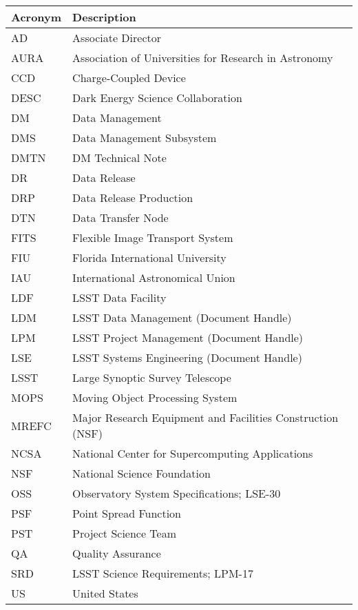 \addtocounter{table}{-1}
\begin{longtable}{|l|p{}|}\hline
\textbf{Acronym} & \textbf{Description}  \\\hline

AD & Associate Director \\\hline
AURA & Association of Universities for Research in Astronomy \\\hline
CCD & Charge-Coupled Device \\\hline
DESC & Dark Energy Science Collaboration \\\hline
DM & Data Management \\\hline
DMS & Data Management Subsystem \\\hline
DMTN & \gls{DM} Technical Note \\\hline
DR & Data Release \\\hline
DRP & Data Release Production \\\hline
DTN & Data Transfer Node \\\hline
FITS & Flexible Image Transport System \\\hline
FIU & Florida International University \\\hline
IAU & International Astronomical Union \\\hline
LDF & \gls{LSST} Data Facility \\\hline
LDM & \gls{LSST} Data Management (Document Handle) \\\hline
LPM & \gls{LSST} Project Management (Document Handle) \\\hline
LSE & \gls{LSST} Systems Engineering (Document Handle) \\\hline
LSST & Large Synoptic Survey Telescope \\\hline
MOPS & Moving Object Processing System \\\hline
MREFC & Major Research Equipment and Facilities Construction (\gls{NSF}) \\\hline
NCSA & National Center for Supercomputing Applications \\\hline
NSF & National Science Foundation \\\hline
OSS & Observatory System Specifications; LSE-30 \\\hline
PSF & Point Spread Function \\\hline
PST & Project Science Team \\\hline
QA & Quality Assurance \\\hline
SRD & \gls{LSST} Science Requirements; LPM-17 \\\hline
US & United States \\\hline
\end{longtable}
